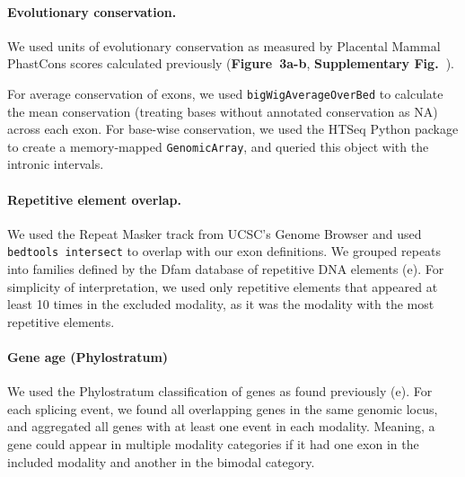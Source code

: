 \paragraph{Evolutionary conservation.} We used units of evolutionary conservation as measured by Placental Mammal PhastCons \cite{Siepel:2005cu} scores calculated previously \cite{Lovci:2013cq} (\textbf{Figure~3a-b}, \textbf{Supplementary Fig.~}).

For average conservation of exons, we used \texttt{bigWigAverageOverBed} \cite{Kent:2010ff} to calculate the mean conservation (treating bases without annotated conservation as NA) across each exon. For base-wise conservation, we used the HTSeq \cite{Anders:2015gf} Python package to create a memory-mapped \texttt{GenomicArray}, and queried this object with the intronic intervals.


\paragraph{Repetitive element overlap.} We used the Repeat Masker track\cite{Rosenbloom:2015bg} from UCSC's Genome Browser\cite{Kent:2002bwa} and used \texttt{bedtools intersect}\cite{Quinlan:2010kma} to overlap with our exon definitions. We grouped repeats into families defined by the Dfam \cite{Hubley:2016fu} database of repetitive DNA elements (e). For simplicity of interpretation, we used only repetitive elements that appeared at least 10 times in the excluded modality, as it was the modality with the most repetitive elements.

\paragraph{Gene age (Phylostratum)}

We used the Phylostratum classification of genes as found previously\cite{DomazetLoso:2008ba} (e). For each splicing event, we found all overlapping genes in the same genomic locus, and aggregated all genes with at least one event in each modality. Meaning, a gene could appear in multiple modality categories if it had one exon in the included modality and another in the bimodal category.


